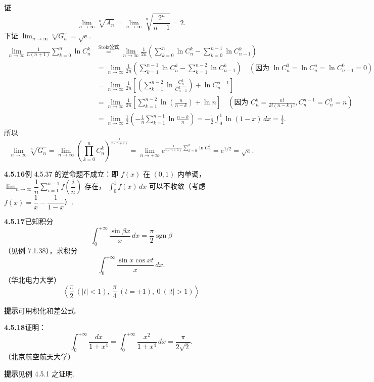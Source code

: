 \documentclass[UTF8,12pt,a4paper,fontset=fandol]{ctexart}
\begin{document}
\noindent\textbf{证}\quad
\[
\lim_{n\to\infty}\sqrt[n]{A_n}
=\lim_{n\to\infty}\sqrt[n]{\frac{2^n}{n+1}}=2.
\]
下证 $\displaystyle\lim_{n\to\infty}\sqrt[n]{G_n}=\sqrt e$.
\[
\begin{aligned}
\lim_{n\to\infty}\frac1{n(n+1)}\sum_{k=0}^n\ln C_n^k
&\stackrel{\text{Stolz公式}}{=}
\lim_{n\to\infty}\frac1{2n}\left(\sum_{k=0}^n\ln C_n^k-\sum_{k=0}^{n-1}\ln C_{n-1}^k\right)\\
&=\lim_{n\to\infty}\frac1{2n}\left(\sum_{k=1}^{n-1}\ln C_n^k-\sum_{k=1}^{n-2}\ln C_{n-1}^k\right)
\quad(\text{因为 }\ln C_n^0=\ln C_n^n=\ln C_{n-1}^0=0)\\
&=\lim_{n\to\infty}\frac1{2n}\left[\left(\sum_{k=1}^{n-2}\ln\frac{C_n^k}{C_{n-1}^k}\right)+\ln C_n^{n-1}\right]\\
&=\lim_{n\to\infty}\frac1{2n}\left[\sum_{k=1}^{n-2}\ln\left(\frac n{n-k}\right)+\ln n\right]
\quad\left(\text{因为 }C_n^k=\frac{n!}{k!(n-k)!}, C_n^{n-1}=C_n^1=n\right)\\
&=\lim_{n\to\infty}\frac12\left(-\frac1n\sum_{k=1}^{n-1}\ln\frac{n-k}n\right)
=-\frac12\int_0^1\ln(1-x)\,dx=\frac12.
\end{aligned}
\]
所以
\[
\lim_{n\to\infty}\sqrt[n]{G_n}
=\lim_{n\to\infty}\left(\prod_{k=0}^n C_n^k\right)^{\frac1{n(n+1)}}
=\lim_{n\to+\infty}e^{\frac1{n(n+1)}\sum_{k=0}^n\ln C_n^k}
=e^{1/2}=\sqrt e.
\]

\noindent\textbf{4.5.16}\quad 例 4.5.37 的逆命题不成立：即 $f(x)$ 在 $(0,1)$ 内单调，
$\displaystyle\lim_{n\to\infty}\dfrac1n\sum_{i=1}^{n-1}f\left(\dfrac in\right)$ 存在，
$\displaystyle\int_0^1f(x)\,dx$ 可以不收敛（考虑 $f(x)=\dfrac1x-\dfrac1{1-x}$）.

\noindent\textbf{4.5.17}\quad 已知积分
\[
\int_0^{+\infty}\frac{\sin\beta x}{x}\,dx=\frac\pi2\operatorname{sgn}\beta
\]
（见例 7.1.38），求积分
\[
\int_0^{+\infty}\frac{\sin x\cos xt}{x}\,dx.
\]
（华北电力大学）
\[
\left\langle \frac\pi2\ (|t|<1),\ \frac\pi4\ (t=\pm1),\ 0\ (|t|>1)\right\rangle
\]

\noindent\textbf{提示}\quad 可用积化和差公式.

\noindent\textbf{4.5.18}\quad 证明：
\[
\int_0^{+\infty}\frac{dx}{1+x^4}
=\int_0^{+\infty}\frac{x^2}{1+x^4}\,dx
=\frac\pi{2\sqrt2}.
\]
（北京航空航天大学）

\noindent\textbf{提示}\quad 见例 4.5.1 之证明.
\end{document}
